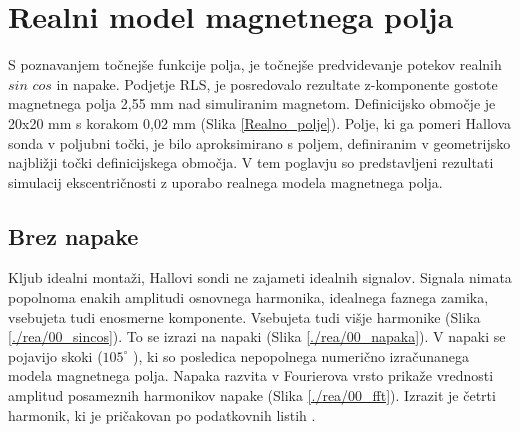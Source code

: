 

\chapter{Realni model magnetnega polja}

S poznavanjem točnejše funkcije polja, je točnejše predvidevanje potekov realnih $sin$ $cos$ in napake. Podjetje RLS,  je posredovalo rezultate z-komponente gostote magnetnega polja 2,55 mm nad simuliranim magnetom.  Definicijsko območje  je 20x20 mm s korakom 0,02 mm (Slika \ref{Realno_polje}).
Polje, ki ga pomeri Hallova sonda v poljubni točki, je bilo aproksimirano s poljem, definiranim v geometrijsko najbližji točki definicijskega območja.%
V tem poglavju so predstavljeni rezultati simulacij ekscentričnosti z uporabo realnega modela magnetnega polja.

\section{Brez napake}
Kljub idealni montaži, Hallovi sondi ne zajameti idealnih signalov. Signala nimata popolnoma enakih amplitudi osnovnega harmonika, idealnega faznega zamika, vsebujeta tudi enosmerne komponente. Vsebujeta tudi višje harmonike (Slika \ref{./rea/00_sincos}). To se izrazi na napaki (Slika \ref{./rea/00_napaka}). V napaki se pojavijo skoki ($105^{\circ}$ ), ki so posledica nepopolnega numerično izračunanega modela magnetnega polja. Napaka razvita v Fourierova vrsto prikaže vrednosti amplitud posameznih harmonikov napake (Slika \ref{./rea/00_fft}). Izrazit je četrti harmonik, ki je pričakovan po podatkovnih listih \cite{AM8192}.
\newpage
